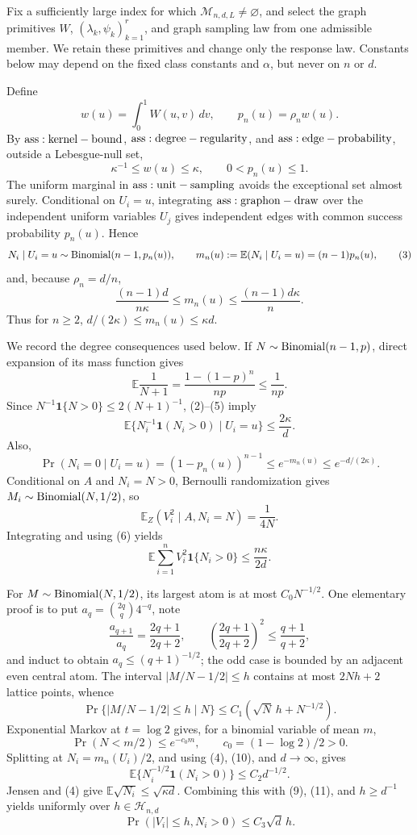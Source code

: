 Fix a sufficiently large index for which \(\mathcal M_{n,d,L}\ne\varnothing\), and select the graph primitives \(W\), \((\lambda_k,\psi_k)_{k=1}^r\), and graph sampling law from one admissible member.  We retain these primitives and change only the response law.  Constants below may depend on the fixed class constants and \(\alpha\), but never on \(n\) or \(d\).

Define
\[
 w(u)=\int_0^1W(u,v)\,dv,
 \qquad p_n(u)=\rho_nw(u).
\tag{1}
\]
By \({\rm ass:kernel-bound}\), \({\rm ass:degree-regularity}\), and \({\rm ass:edge-probability}\), outside a Lebesgue-null set,
\[
 \kappa^{-1}\leq w(u)\leq\kappa,
 \qquad 0<p_n(u)\leq1.
\tag{2}
\]
The uniform marginal in \({\rm ass:unit-sampling}\) avoids the exceptional set almost surely.  Conditional on \(U_i=u\), integrating \({\rm ass:graphon-draw}\) over the independent uniform variables \(U_j\) gives independent edges with common success probability \(p_n(u)\).  Hence
\[
 N_i\mid U_i=u\sim{\rm Binomial}(n-1,p_n(u)),
 \qquad m_n(u):=\mathbb E(N_i\mid U_i=u)=(n-1)p_n(u),
\tag{3}
\]
and, because \(\rho_n=d/n\),
\[
 \frac{(n-1)d}{n\kappa}\leq m_n(u)\leq\frac{(n-1)d\kappa}{n}.
\tag{4}
\]
Thus for \(n\geq2\), \(d/(2\kappa)\leq m_n(u)\leq\kappa d\).

We record the degree consequences used below.  If \(N\sim{\rm Binomial}(n-1,p)\), direct expansion of its mass function gives
\[
 \mathbb E\frac1{N+1}=\frac{1-(1-p)^n}{np}\leq\frac1{np}.
\tag{5}
\]
Since \(N^{-1}\mathbf1\{N>0\}\leq2(N+1)^{-1}\), (2)--(5) imply
\[
 \mathbb E\{N_i^{-1}\mathbf1(N_i>0)\mid U_i=u\}\leq\frac{2\kappa}{d}.
\tag{6}
\]
Also,
\[
 \Pr(N_i=0\mid U_i=u)=(1-p_n(u))^{n-1}
 \leq e^{-m_n(u)}\leq e^{-d/(2\kappa)}.
\tag{7}
\]
Conditional on \(A\) and \(N_i=N>0\), Bernoulli randomization gives \(M_i\sim{\rm Binomial}(N,1/2)\), so
\[
 \mathbb E_Z(V_i^2\mid A,N_i=N)=\frac1{4N}.
\]
Integrating and using (6) yields
\[
 \mathbb E\sum_{i=1}^nV_i^2\mathbf1\{N_i>0\}\leq\frac{n\kappa}{2d}.
\tag{8}
\]

For \(M\sim{\rm Binomial}(N,1/2)\), its largest atom is at most \(C_0N^{-1/2}\).  One elementary proof is to put \(a_q={2q\choose q}4^{-q}\), note
\[
 \frac{a_{q+1}}{a_q}=\frac{2q+1}{2q+2},
 \qquad \left(\frac{2q+1}{2q+2}\right)^2\leq\frac{q+1}{q+2},
\]
and induct to obtain \(a_q\leq(q+1)^{-1/2}\); the odd case is bounded by an adjacent even central atom.  The interval \(|M/N-1/2|\leq h\) contains at most \(2Nh+2\) lattice points, whence
\[
 \Pr\{|M/N-1/2|\leq h\mid N\}
 \leq C_1(\sqrt N\,h+N^{-1/2}).
\tag{9}
\]
Exponential Markov at \(t=\log2\) gives, for a binomial variable of mean \(m\),
\[
 \Pr(N<m/2)\leq e^{-c_0m},
 \qquad c_0=(1-\log2)/2>0.
\tag{10}
\]
Splitting at \(N_i=m_n(U_i)/2\), and using (4), (10), and \(d\to\infty\), gives
\[
 \mathbb E\{N_i^{-1/2}\mathbf1(N_i>0)\}\leq C_2d^{-1/2}.
\tag{11}
\]
Jensen and (4) give \(\mathbb E\sqrt{N_i}\leq\sqrt{\kappa d}\).  Combining this with (9), (11), and \(h\geq d^{-1}\) yields uniformly over \(h\in\mathcal H_{n,d}\)
\[
 \Pr(|V_i|\leq h,N_i>0)\leq C_3\sqrt d\,h.
\tag{12}
\]

